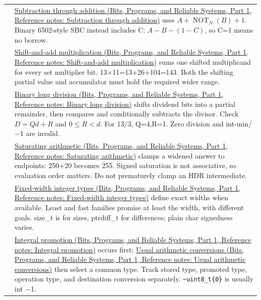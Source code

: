 {\begin{longtable}[]{@{}
  >{\raggedright\arraybackslash}p{}
  >{\raggedright\arraybackslash}p{}@{}}
34 & \href{../01-Bits-Programs-and-Reliable-Systems-P01/main.pdf\#nameddest=appendix-1c7df340573e}{Subtraction through addition (Bits, Programs, and Reliable Systems, Part 1, Reference notes: Subtraction through addition)} uses \(A+\operatorname{NOT}_N(B)+1\). Binary 6502-style SBC instead includes C: \(A-B-(1-C)\), so C=1 means no borrow. \\
35 & \href{../01-Bits-Programs-and-Reliable-Systems-P01/main.pdf\#nameddest=appendix-a65290d66ed9}{Shift-and-add multiplication (Bits, Programs, and Reliable Systems, Part 1, Reference notes: Shift-and-add multiplication)} sums one shifted multiplicand for every set multiplier bit. 13×11=13+26+104=143. Both the shifting partial value and accumulator must hold the required wider range. \\
36 & \href{../01-Bits-Programs-and-Reliable-Systems-P01/main.pdf\#nameddest=appendix-89985e6a2685}{Binary long division (Bits, Programs, and Reliable Systems, Part 1, Reference notes: Binary long division)} shifts dividend bits into a partial remainder, then compares and conditionally subtracts the divisor. Check \(D=Qd+R\) and \(0\le R<d\). For 13/3, Q=4,R=1. Zero division and int-min/−1 are invalid. \\
37 & \href{../01-Bits-Programs-and-Reliable-Systems-P01/main.pdf\#nameddest=appendix-3999c6209649}{Saturating arithmetic (Bits, Programs, and Reliable Systems, Part 1, Reference notes: Saturating arithmetic)} clamps a widened answer to endpoints: 250+20 becomes 255. Signed saturation is not associative, so evaluation order matters. Do not prematurely clamp an HDR intermediate. \\
38 & \href{../01-Bits-Programs-and-Reliable-Systems-P01/main.pdf\#nameddest=appendix-cc04044b5782}{Fixed-width integer types (Bits, Programs, and Reliable Systems, Part 1, Reference notes: Fixed-width integer types)} define exact widths when available. Least and fast families promise at least the width, with different goals. size\_t is for sizes, ptrdiff\_t for differences; plain char signedness varies. \\
39 & \href{../01-Bits-Programs-and-Reliable-Systems-P01/main.pdf\#nameddest=appendix-45303d03796a}{Integral promotion (Bits, Programs, and Reliable Systems, Part 1, Reference notes: Integral promotion)} occurs first; \href{../01-Bits-Programs-and-Reliable-Systems-P01/main.pdf\#nameddest=appendix-5e2d663adf7f}{Usual arithmetic conversions (Bits, Programs, and Reliable Systems, Part 1, Reference notes: Usual arithmetic conversions)} then select a common type. Track stored type, promoted type, operation type, and destination conversion separately. \texttt{\textasciitilde{}uint8\_t\{0\}} is usually int −1. \\

\end{longtable}}
